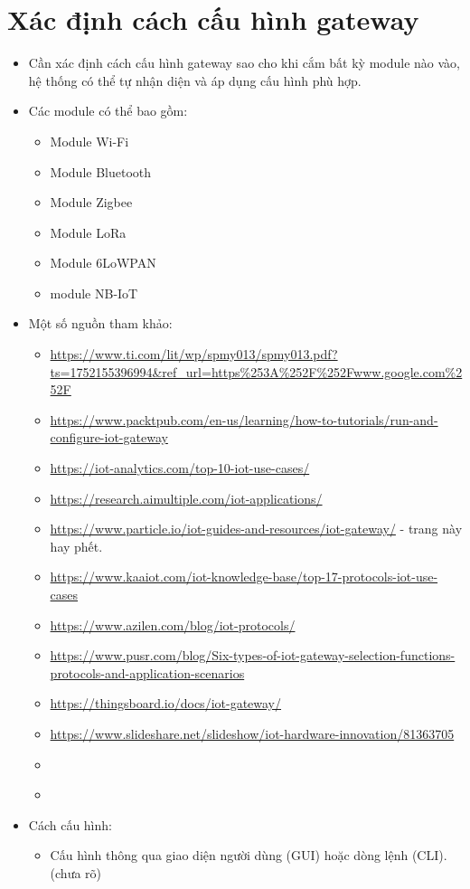 \section*{Xác định cách cấu hình gateway}
\begin{itemize}
    \item Cần xác định cách cấu hình gateway sao cho khi cắm bất kỳ module nào vào, hệ thống có thể tự nhận diện và áp dụng cấu hình phù hợp.
    \item Các module có thể bao gồm:
    \begin{itemize}
        \item Module Wi-Fi
        \item Module Bluetooth
        \item Module Zigbee
        \item Module LoRa
        \item Module 6LoWPAN
        \item module NB-IoT
    \end{itemize}
    \item Một số nguồn tham khảo:
    \begin{itemize}
        \item \url{https://www.ti.com/lit/wp/spmy013/spmy013.pdf?ts=1752155396994&ref_url=https%253A%252F%252Fwww.google.com%252F}
        \item \url{https://www.packtpub.com/en-us/learning/how-to-tutorials/run-and-configure-iot-gateway}
        \item \url{https://iot-analytics.com/top-10-iot-use-cases/}
        \item \url{https://research.aimultiple.com/iot-applications/}
        \item \url{https://www.particle.io/iot-guides-and-resources/iot-gateway/} - trang này hay phết.
        \item \url{https://www.kaaiot.com/iot-knowledge-base/top-17-protocols-iot-use-cases}
        \item \url{https://www.azilen.com/blog/iot-protocols/}
        \item \url{https://www.pusr.com/blog/Six-types-of-iot-gateway-selection-functions-protocols-and-application-scenarios}
        \item \url{https://thingsboard.io/docs/iot-gateway/}
        \item \url{https://www.slideshare.net/slideshow/iot-hardware-innovation/81363705}
        \item \url{}
        \item \url{}
    \end{itemize}
    \item Cách cấu hình:
    \begin{itemize}
        \item Cấu hình thông qua giao diện người dùng (GUI) hoặc dòng lệnh (CLI). (chưa rõ)
    \end{itemize}
\end{itemize}

